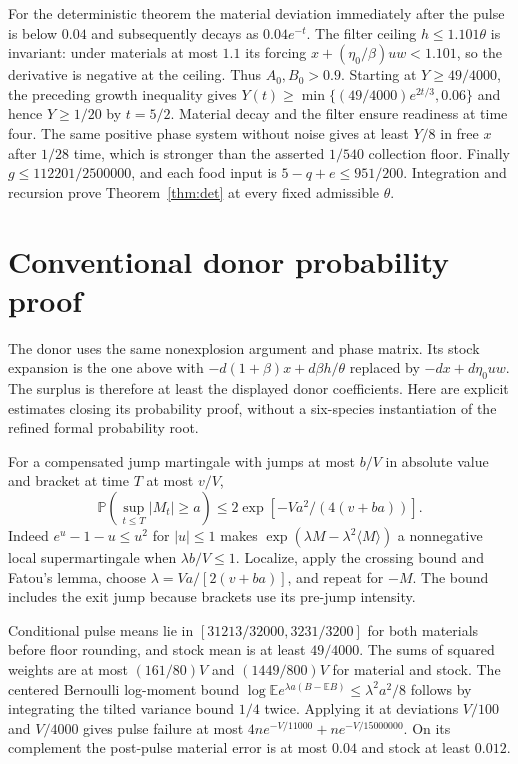 \documentclass[11pt]{article}
\theoremstyle{definition}\newtheorem{definition}[theorem]{Definition}
\newcommand{\Law}{\mathbb P}
\begin{document}
For the deterministic theorem the material deviation immediately after the pulse
is below $0.04$ and subsequently decays as $0.04e^{-t}$. The filter ceiling
$h\le1.101\theta$ is invariant: under materials at most $1.1$ its forcing
$x+(\eta_0/\beta)uw<1.101$, so the derivative is negative at the ceiling.
Thus $A_0,B_0>0.9$. Starting at $Y\ge49/4000$, the preceding growth inequality
gives $Y(t)\ge\min\{(49/4000)e^{2t/3},0.06\}$ and hence $Y\ge1/20$ by
$t=5/2$. Material decay and the filter ensure readiness at time four.
The same positive phase system without noise gives at least $Y/8$ in free $x$
after $1/28$ time, which is stronger than the asserted $1/540$ collection floor.
Finally $g\le112201/2500000$, and each food input is $5-q+e\le951/200$.
Integration and recursion prove Theorem~\ref{thm:det} at every fixed admissible $\theta$.

\section{Conventional donor probability proof}\label{app:donor}
The donor uses the same nonexplosion argument and phase matrix. Its stock expansion
is the one above with $-d(1+\beta)x+d\beta h/\theta$ replaced by
$-dx+d\eta_0uw$. The surplus is therefore at least the displayed donor coefficients.
Here are explicit estimates closing its probability proof, without a six-species
instantiation of the refined formal probability root.

For a compensated jump martingale with jumps at most $b/V$ in absolute value and
bracket at time $T$ at most $v/V$,
\begin{equation}\label{eq:elementarytail}
\Law(\sup_{t\le T}|M_t|\ge a)\le
2\exp[-Va^2/(4(v+ba))].
\end{equation}
Indeed $e^u-1-u\le u^2$ for $|u|\le1$ makes
$\exp(\lambda M-\lambda^2\langle M\rangle)$ a nonnegative local
supermartingale when $\lambda b/V\le1$. Localize, apply the crossing bound and
Fatou's lemma, choose $\lambda=Va/[2(v+ba)]$, and repeat for $-M$.
The bound includes the exit jump because brackets use its pre-jump intensity.

Conditional pulse means lie in $[31213/32000,3231/3200]$ for both materials
before floor rounding, and stock mean is at least $49/4000$.
The sums of squared weights are at most $(161/80)V$ and $(1449/800)V$
for material and stock. The centered Bernoulli log-moment bound
$\log\mathbb E e^{\lambda a(B-\mathbb EB)}\le\lambda^2a^2/8$
follows by integrating the tilted variance bound $1/4$ twice.
Applying it at deviations $V/100$ and $V/4000$ gives pulse failure at most
$4ne^{-V/11000}+ne^{-V/15000000}$. On its complement the post-pulse material
error is at most $0.04$ and stock at least $0.012$.
\end{document}
